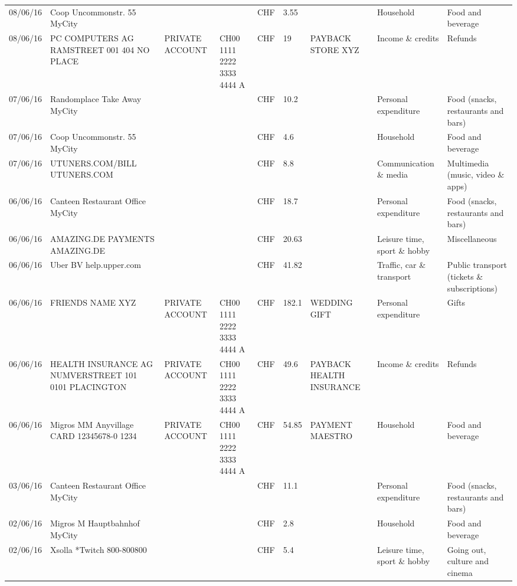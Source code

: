 \begin{landscape}
\begin{table}[t]
\begin{center}
\begin{tabular}{lllllllll}
		08/06/16 & Coop Uncommonstr. 55   MyCity &       &       & CHF   & 3.55  &       & Household & Food and beverage \\
		08/06/16 & PC COMPUTERS AG RAMSTREET 001 404 NO PLACE & PRIVATE ACCOUNT & CH00 1111 2222 3333 4444 A & CHF   & 19    & PAYBACK STORE XYZ & Income \& credits & Refunds \\
		07/06/16 & Randomplace Take Away     MyCity &       &       & CHF   & 10.2  &       & Personal expenditure & Food (snacks, restaurants and bars) \\
		07/06/16 & Coop Uncommonstr. 55   MyCity &       &       & CHF   & 4.6   &       & Household & Food and beverage \\
		07/06/16 & UTUNERS.COM/BILL          UTUNERS.COM &       &       & CHF   & 8.8   &       & Communication \& media & Multimedia (music, video \& apps) \\
		06/06/16 & Canteen Restaurant Office      MyCity &       &       & CHF   & 18.7  &       & Personal expenditure & Food (snacks, restaurants and bars) \\
		06/06/16 & AMAZING.DE PAYMENTS       AMAZING.DE &       &       & CHF   & 20.63 &       & Leisure time, sport \& hobby & Miscellaneous \\
		06/06/16 & Uber BV                  help.upper.com &       &       & CHF   & 41.82 &       & Traffic, car \& transport & Public transport (tickets \& subscriptions) \\
		06/06/16 & FRIENDS NAME XYZ & PRIVATE ACCOUNT & CH00 1111 2222 3333 4444 A & CHF   & 182.1 & WEDDING GIFT & Personal expenditure & Gifts \\
		06/06/16 & HEALTH INSURANCE AG NUMVERSTREET 101 0101 PLACINGTON & PRIVATE ACCOUNT & CH00 1111 2222 3333 4444 A & CHF   & 49.6  & PAYBACK HEALTH INSURANCE & Income \& credits & Refunds \\
		06/06/16 & Migros MM Anyvillage CARD 12345678-0 1234 & PRIVATE ACCOUNT & CH00 1111 2222 3333 4444 A & CHF   & 54.85 & PAYMENT MAESTRO & Household & Food and beverage \\
		03/06/16 & Canteen Restaurant Office      MyCity &       &       & CHF   & 11.1  &       & Personal expenditure & Food (snacks, restaurants and bars) \\
		02/06/16 & Migros M Hauptbahnhof    MyCity &       &       & CHF   & 2.8   &       & Household & Food and beverage \\
		02/06/16 & Xsolla *Twitch           800-800800 &       &       & CHF   & 5.4   &       & Leisure time, sport \& hobby & Going out, culture and cinema \\

\end{tabular}
\end{center}
\end{table}
\end{landscape}
